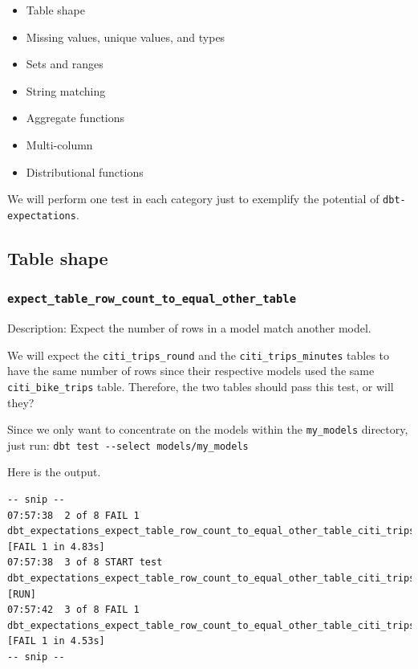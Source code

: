 \documentclass[
]{book}
\providecommand{\tightlist}{%
  \setlength{\itemsep}{0pt}\setlength{\parskip}{0pt}}
\begin{document}
\begin{itemize}
\tightlist
\item
  Table shape
\item
  Missing values, unique values, and types
\item
  Sets and ranges
\item
  String matching
\item
  Aggregate functions
\item
  Multi-column
\item
  Distributional functions
\end{itemize}

We will perform one test in each category just to exemplify the potential of \texttt{dbt-expectations}.

\hypertarget{table-shape}{%
\subsection{Table shape}\label{table-shape}}

\hypertarget{expect_table_row_count_to_equal_other_table}{%
\subsubsection{\texorpdfstring{\texttt{expect\_table\_row\_count\_to\_equal\_other\_table}}{expect\_table\_row\_count\_to\_equal\_other\_table}}\label{expect_table_row_count_to_equal_other_table}}

Description: Expect the number of rows in a model match another model.

We will expect the \texttt{citi\_trips\_round} and the \texttt{citi\_trips\_minutes} tables to have the same number of rows since their respective models used the same \texttt{citi\_bike\_trips} table. Therefore, the two tables should pass this test, or will they?

Since we only want to concentrate on the models within the \texttt{my\_models} directory, just run: \texttt{dbt\ test\ -\/-select\ models/my\_models}

Here is the output.

\begin{verbatim}
-- snip --
07:57:38  2 of 8 FAIL 1 dbt_expectations_expect_table_row_count_to_equal_other_table_citi_trips_minutes_ref_citi_trips_round_  [FAIL 1 in 4.83s]
07:57:38  3 of 8 START test dbt_expectations_expect_table_row_count_to_equal_other_table_citi_trips_round_ref_citi_trips_minutes_  [RUN]
07:57:42  3 of 8 FAIL 1 dbt_expectations_expect_table_row_count_to_equal_other_table_citi_trips_round_ref_citi_trips_minutes_  [FAIL 1 in 4.53s]
-- snip --
\end{verbatim}
\end{document}

